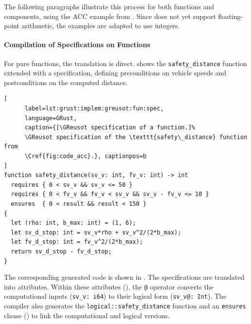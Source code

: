 The following paragraphs illustrate this process for both functions and components, using the ACC
example from . Since \Creusot does not yet support floating-point
arithmetic, the examples are adapted to use integers.

\paragraph{Compilation of Specifications on Functions}

For pure functions, the translation is direct.  shows the
\texttt{safety\_distance} function extended with a \GReusot specification, defining preconditions on
vehicle speeds and postconditions on the computed distance.

\begin{lstlisting}[
      label=lst:grust:implem:greusot:fun:spec,
      language=GRust,
      caption={[\GReusot specification of a function.]%
      \GReusot specification of the \texttt{safety\_distance} function from
      \Cref{fig:code_acc}.}, captionpos=b
]
function safety_distance(sv_v: int, fv_v: int) -> int
  requires { 0 < sv_v && sv_v <= 50 }
  requires { 0 < fv_v && fv_v < sv_v && sv_v - fv_v <= 10 }
  ensures  { 0 < result && result < 150 }
{
  let (rho: int, b_max: int) = (1, 6);
  let sv_d_stop: int = sv_v*rho + sv_v^2/(2*b_max);
  let fv_d_stop: int = fv_v^2/(2*b_max);
  return sv_d_stop - fv_d_stop;
}
\end{lstlisting}

The corresponding generated code is shown in . The
specifications are translated into \Creusot attributes. Within these attributes
(), the \texttt{@} operator converts the
computational inputs (\eg \texttt{sv\_v: i64}) to their logical form (\texttt{sv\_v@: Int}). The
compiler also generates the \texttt{logical::safety\_distance} function and an \texttt{ensures}
clause () to link the computational and
logical versions.

